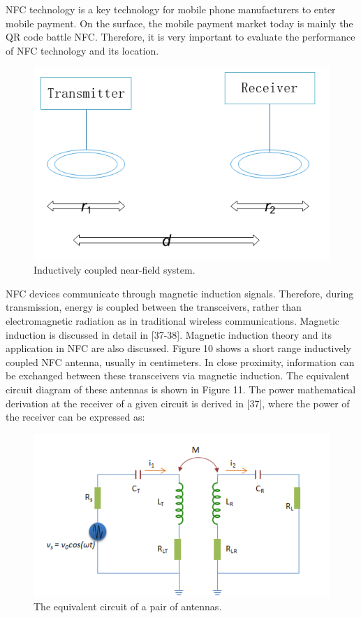 \documentclass[journal]{IEEEtran}
\begin{document}
NFC technology is a key technology for mobile phone manufacturers to enter mobile payment. On the surface, the mobile payment market today is mainly the QR code battle NFC. Therefore, it is very important to evaluate the performance of NFC technology and its location.

\begin{figure}[htbp]
\centerline{\includegraphics[scale=0.45]{Inductively_couled_near-field.png}}
\caption{Inductively coupled near-field system.}
\label{fig}
\end{figure}

NFC devices communicate through magnetic induction signals. Therefore, during transmission, energy is coupled between the transceivers, rather than electromagnetic radiation as in traditional wireless communications. Magnetic induction is discussed in detail in [37-38]. Magnetic induction theory and its application in NFC are also discussed. Figure 10 shows a short range inductively coupled NFC antenna, usually in centimeters. In close proximity, information can be exchanged between these transceivers via magnetic induction. The equivalent circuit diagram of these antennas is shown in Figure 11. The power mathematical derivation at the receiver of a given circuit is derived in [37], where the power of the receiver can be expressed as:

\begin{figure}[htbp]
\centerline{\includegraphics[scale=0.35]{EquivalentcircuitofinFigur1.png}}
\caption{The equivalent circuit of a pair of antennas.}
\label{fig}
\end{figure}
\end{document}

